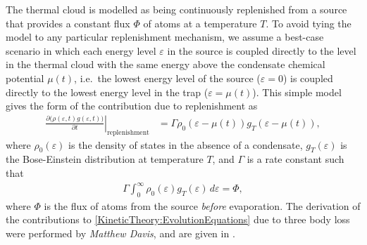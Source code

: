 The thermal cloud is modelled as being continuously replenished from a source that provides a constant flux $\Phi$ of atoms at a temperature $T$.  To avoid tying the model to any particular replenishment mechanism, we assume a best-case scenario in which each energy level $\varepsilon$ in the source is coupled directly to the level in the thermal cloud with the same energy above the condensate chemical potential $\mu(t)$, i.e.\ the lowest energy level of the source ($\varepsilon=0$) is coupled directly to the lowest energy level in the trap ($\varepsilon = \mu(t)$).  This simple model gives the form of the contribution due to replenishment as
\begin{align}
    \left. \frac{\partial \big(\rho(\varepsilon, t) g(\varepsilon, t)\big)}{\partial t} \right|_\text{replenishment} &= \Gamma \rho_0(\varepsilon - \mu(t)) g_T(\varepsilon - \mu(t)),
    \label{KineticTheory:ReplenishmentProcess}
\end{align}
where $\rho_0(\varepsilon)$ is the density of states in the absence of a condensate, $g_T(\varepsilon)$ is the Bose-Einstein  distribution at temperature $T$, and $\Gamma$ is a rate constant such that
\begin{align}
    \Gamma \int_0^\infty \rho_0(\varepsilon) g_T(\varepsilon)\, d\varepsilon = \Phi,
    \label{KineticTheory:GammaPhiRelation}
\end{align}
where $\Phi$ is the flux of atoms from the source \emph{before} evaporation.  The derivation of the contributions to \eqref{KineticTheory:EvolutionEquations} due to three body loss were performed by \emph{Matthew Davis}, and are given in .

\parasep

